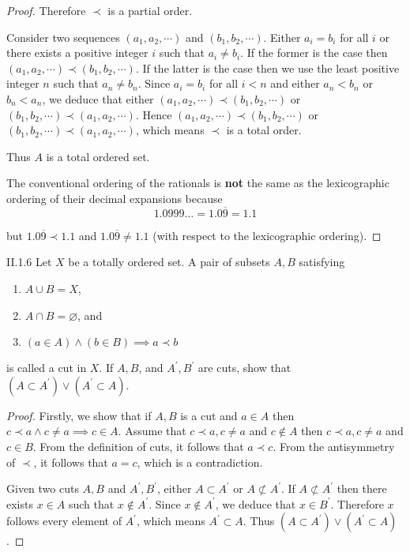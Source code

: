 \begin{proof}
	Therefore \( \prec \) is a partial order.

	Consider two sequences \( (a_{1}, a_{2}, \cdots) \) and \( (b_{1}, b_{2}, \cdots) \). Either \( a_{i} = b_{i} \) for all \( i \) or there exists a positive integer \( i \) such that \( a_{i} \ne b_{i} \). If the former is the case then \( (a_{1}, a_{2}, \cdots) \prec (b_{1}, b_{2}, \cdots) \). If the latter is the case then we use the least positive integer \( n \) such that \( a_{n} \ne b_{n} \). Since \( a_{i} = b_{i} \) for all \( i < n \) and either \( a_{n} < b_{n} \) or \( b_{n} < a_{n} \), we deduce that either \( (a_{1}, a_{2}, \cdots) \prec (b_{1}, b_{2}, \cdots) \) or \( (b_{1}, b_{2}, \cdots) \prec (a_{1}, a_{2}, \cdots) \). Hence \( (a_{1}, a_{2}, \cdots) \prec (b_{1}, b_{2}, \cdots) \) or \( (b_{1}, b_{2}, \cdots) \prec (a_{1}, a_{2}, \cdots) \), which means \( \prec \) is a total order.

	Thus \( A \) is a total ordered set.

	\bigskip

	The conventional ordering of the rationals is \textbf{not} the same as the lexicographic ordering of their decimal expansions because
	\[
		1.0999\ldots = 1.0\overline{9} = 1.1
	\]

	but \( 1.0\overline{9} \prec 1.1 \) and \( 1.0\overline{9} \ne 1.1 \) (with respect to the lexicographic ordering).
\end{proof}

\begin{problem}{II.1.6}
Let \(X\) be a totally ordered set. A pair of subsets \(A, B\) satisfying
\begin{enumerate}[label={(\alph*)}]
	\item \(A \cup B = X\),
	\item \(A \cap B = \varnothing\), and
	\item \((a \in A) \land (b \in B) \implies a \prec b\)
\end{enumerate}

is called a cut in \(X\). If \(A, B\), and \(A^{\prime}, B^{\prime}\) are cuts, show that \((A \subset A^{\prime}) \lor (A^{\prime} \subset A)\).
\end{problem}

\begin{proof}
	Firstly, we show that if \(A, B\) is a cut and \( a \in A \) then \( c \prec a \land c \ne a \implies c \in A \). Assume that \( c \prec a, c \ne a \) and \( c \notin A \) then \( c \prec a, c \ne a \) and \( c \in B \). From the definition of cuts, it follows that \( a \prec c \). From the antisymmetry of \( \prec \), it follows that \( a = c \), which is a contradiction.

	Given two cuts \(A, B\) and \(A^{\prime}, B^{\prime}\), either \( A \subset A^{\prime} \) or \( A \not\subset A^{\prime} \). If \( A \not\subset A^{\prime} \) then there exists \( x \in A \) such that \( x \notin A^{\prime} \). Since \( x \notin A^{\prime} \), we deduce that \( x \in B^{\prime} \). Therefore \( x \) follows every element of \( A^{\prime} \), which means \( A^{\prime} \subset A \). Thus \((A \subset A^{\prime}) \lor (A^{\prime} \subset A)\).
\end{proof}


